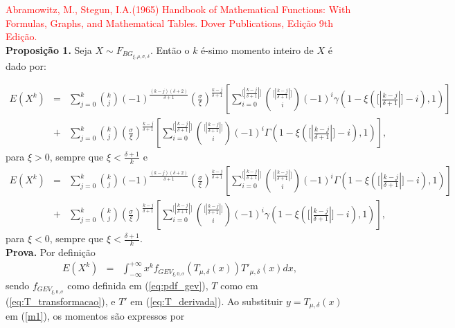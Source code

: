 \documentclass[pdftex,11pt]{article}%
\numberwithin{equation}{section} %
\begin{document}
	\textcolor{red}{
		Abramowitz, M., Stegun, I.A.(1965) Handbook of Mathematical Functions: With Formulas, Graphs, and Mathematical Tables. Dover Publications, Edição	9th Edição.
	}
	\vspace{1cm}\\
	\textbf{Proposição 1.}
	Seja $X\sim F_{BG_{\xi,\mu,\sigma, \delta}}$. Então o $k$ é-simo   momento inteiro  de $X$ é  dado por:
	
	\begin{eqnarray}\label{momentxi>}
		E(X^k)&=&\sum_{j=0}^{k}\binom{k}{j} (-1)^{\frac{(k-j)(\delta+2)}{\delta+1}} \left(\frac{\sigma}{\xi}\right)^{\frac{k-j}{\delta+1}} \left[ \sum_{i=0}^{\lbrack| \frac{k-j}{\delta+1} | \rbrack} \binom{\lbrack | \frac{k-j}{\delta+1} | \rbrack}{i}(-1)^{i} \gamma \left(1-\xi \left( \lbrack | \frac{k-j}{\delta+1} | \rbrack -i \right), 1 \right)\right] \nonumber\\
		&+& \sum_{j=0}^{k}\binom{k}{j} \left(\frac{\sigma}{\xi}\right)^{\frac{k-j}{\delta+1}} \left[ \sum_{i=0}^{\lbrack| \frac{k-j}{\delta+1} | \rbrack} \binom{\lbrack | \frac{k-j}{\delta+1} | \rbrack}{i}(-1)^{i} \Gamma \left(1-\xi \left( \lbrack | \frac{k-j}{\delta+1} | \rbrack -i \right), 1 \right) \right],
	\end{eqnarray}
	para $\xi> 0$, sempre que $\xi<\frac{\delta+1}{k}$ e
	\begin{eqnarray}\label{momentxi<}
		E(X^k)&=&\sum_{j=0}^{k}\binom{k}{j} (-1)^{\frac{(k-j)(\delta+2)}{\delta+1}} \left(\frac{\sigma}{\xi}\right)^{\frac{k-j}{\delta+1}} \left[ \sum_{i=0}^{\lbrack| \frac{k-j}{\delta+1} | \rbrack} \binom{\lbrack | \frac{k-j}{\delta+1} | \rbrack}{i}(-1)^{i} \Gamma \left(1-\xi \left( \lbrack | \frac{k-j}{\delta+1} | \rbrack -i \right), 1 \right) \right] \nonumber\\
		&+& \sum_{j=0}^{k}\binom{k}{j} \left(\frac{\sigma}{\xi}\right)^{\frac{k-j}{\delta+1}} \left[ \sum_{i=0}^{\lbrack| \frac{k-j}{\delta+1} | \rbrack} \binom{\lbrack | \frac{k-j}{\delta+1} | \rbrack}{i}(-1)^{i} \gamma \left(1-\xi \left( \lbrack | \frac{k-j}{\delta+1} | \rbrack -i \right), 1 \right) \right],
	\end{eqnarray}
	para $\xi< 0$, sempre que $\xi<\frac{\delta+1}{k}$.
	\\
	\textbf{Prova.} Por definição
	\begin{eqnarray}\label{m1}
		E(X^k)&=& \int_{-\infty}^{+\infty} x^k f_{GEV_{\xi, 0, \sigma}}\left( T_{\mu, \delta}(x)\right) T'_{\mu, \delta}(x) dx, 
	\end{eqnarray}
	sendo $f_{GEV_{\xi, 0, \sigma}}$ como definida em (\ref{eq:pdf_gev}), $T$ como em (\ref{eq:T_transformacao}), e $T'$ em (\ref{eq:T_derivada}). Ao substituir  $y=  T_{\mu, \delta}(x)$ em (\ref{m1}), os momentos são expressos por
	
\end{document}
